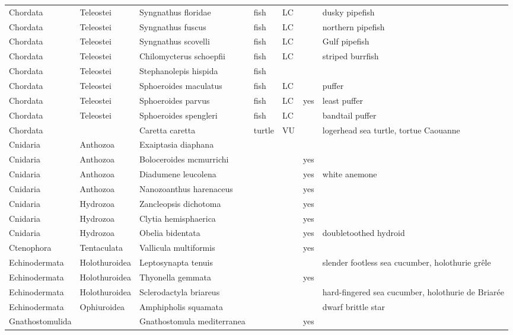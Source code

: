 \begin{longtable}{lllllll}
  Chordata & Teleostei & Syngnathus floridae & fish & LC &  & dusky pipefish \\ 
  Chordata & Teleostei & Syngnathus fuscus & fish & LC &  & northern pipefish \\ 
  Chordata & Teleostei & Syngnathus scovelli & fish & LC &  & Gulf pipefish \\ 
  Chordata & Teleostei & Chilomycterus schoepfii & fish & LC &  & striped burrfish \\ 
  Chordata & Teleostei & Stephanolepis hispida & fish &  &  &  \\ 
  Chordata & Teleostei & Sphoeroides maculatus & fish & LC &  & puffer \\ 
  Chordata & Teleostei & Sphoeroides parvus & fish & LC & yes & least puffer \\ 
  Chordata & Teleostei & Sphoeroides spengleri & fish & LC &  & bandtail puffer \\ 
  Chordata &  & Caretta caretta & turtle & VU &  & logerhead sea turtle, tortue Caouanne \\ 
  Cnidaria & Anthozoa & Exaiptasia diaphana &  &  &  &  \\ 
  Cnidaria & Anthozoa & Boloceroides mcmurrichi &  &  & yes &  \\ 
  Cnidaria & Anthozoa & Diadumene leucolena &  &  & yes & white anemone \\ 
  Cnidaria & Anthozoa & Nanozoanthus harenaceus &  &  & yes &  \\ 
  Cnidaria & Hydrozoa & Zancleopsis dichotoma &  &  & yes &  \\ 
  Cnidaria & Hydrozoa & Clytia hemisphaerica &  &  & yes &  \\ 
  Cnidaria & Hydrozoa & Obelia bidentata &  &  & yes & doubletoothed hydroid \\ 
  Ctenophora & Tentaculata & Vallicula multiformis &  &  & yes &  \\ 
  Echinodermata & Holothuroidea & Leptosynapta tenuis &  &  &  & slender footless sea cucumber, holothurie grêle \\ 
  Echinodermata & Holothuroidea & Thyonella gemmata &  &  & yes &  \\ 
  Echinodermata & Holothuroidea & Sclerodactyla briareus &  &  &  & hard-fingered sea cucumber, holothurie de Briarée \\ 
  Echinodermata & Ophiuroidea & Amphipholis squamata &  &  &  & dwarf brittle star \\ 
  Gnathostomulida &  & Gnathostomula mediterranea &  &  & yes &  \\ 

\end{longtable}
